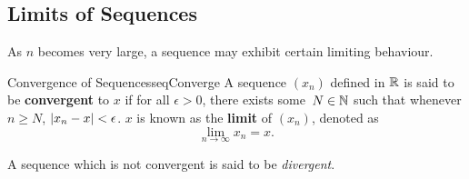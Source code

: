 \documentclass[math]{amznotes}
\theoremstyle{remark}
\begin{document}
\subsection{Limits of Sequences}
As $n$ becomes very large, a sequence may exhibit certain limiting behaviour.
\begin{dfnbox}{Convergence of Sequences}{seqConverge}
    A sequence $(x_n)$ defined in $\mathbb{R}$ is said to be {\color{red} \textbf{convergent}} to $x$ if for all $\epsilon > 0$, there exists some~$N \in \mathbb{N}$ such that whenever $n \geq N$, ${\left\lvert {x_n - x} \right\rvert} < \epsilon$. $x$ is known as the {\color{red} \textbf{limit}} of $(x_n)$, denoted as
    \begin{equation*}
        \lim_{n \to \infty}x_n = x.
    \end{equation*}
\end{dfnbox}
A sequence which is not convergent is said to be \textit{divergent}.
\end{document}
